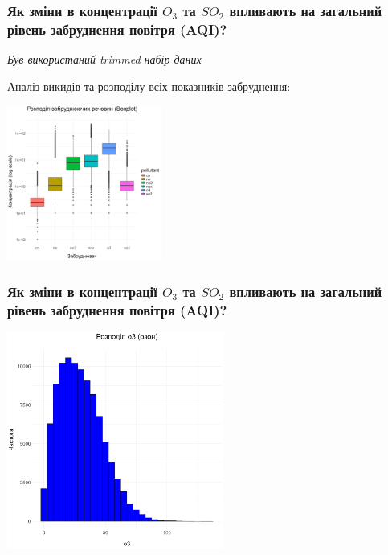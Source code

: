 \documentclass{beamer}
\begin{document}

\begin{frame}
  \frametitle{Як зміни в концентрації $O_3$ та $SO_2$ впливають на загальний рівень забруднення повітря (AQI)?}

  \textit{Був використаний trimmed набір даних}

  Аналіз викидів та розподілу всіх показників забруднення:

  \begin{center}
    \includegraphics[height=2in]{plots/question2/boxplot_pollutants.png}
  \end{center}
\end{frame}

\begin{frame}
  \frametitle{Як зміни в концентрації $O_3$ та $SO_2$ впливають на загальний рівень забруднення повітря (AQI)?}

  \begin{center}
    \includegraphics[height=2.8in]{plots/question2/o3_plot.png}
  \end{center}
\end{frame}
\end{document}
